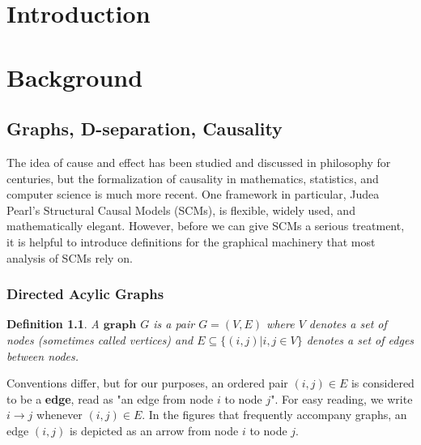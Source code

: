 \documentclass[12pt,twoside]{reedthesis}
\newtheorem{definition}{Definition}[section]
\theoremstyle{definition}
\begin{document}
    \chapter*{Introduction}
         

	
	
    \chapter{Background}

\section{Graphs, D-separation, Causality}
The idea of cause and effect has been studied and discussed in philosophy for centuries, but  the formalization of causality in mathematics, statistics, and computer science is much more recent. One framework in particular, Judea Pearl's Structural Causal Models (SCMs),  \citep{Pearl_2009} is flexible, widely used, and mathematically elegant. However, before we can give SCMs a serious treatment, it is helpful to introduce definitions for the graphical machinery that most analysis of SCMs rely on.

\subsection{Directed Acylic Graphs}
\theoremstyle{definition}
\begin{definition}
A $\mathbf{graph}$ $G$ is a pair $G = (V, E)$ where $V$ denotes a set of nodes (sometimes called vertices) and $E \subseteq \{(i,j) | i,j \in V\}$ denotes a set of edges between nodes.
\end{definition}
Conventions differ, but for our purposes, an ordered pair $(i,j) \in E$ is considered to be a \textbf{edge},  read as "an edge from node $i$ to node $j$".  For easy reading, we write $i \rightarrow j$ whenever $(i,j) \in E$. In the figures that frequently accompany graphs, an edge $(i,j)$ is depicted as an arrow from node $i$ to node $j$.
\end{document}
